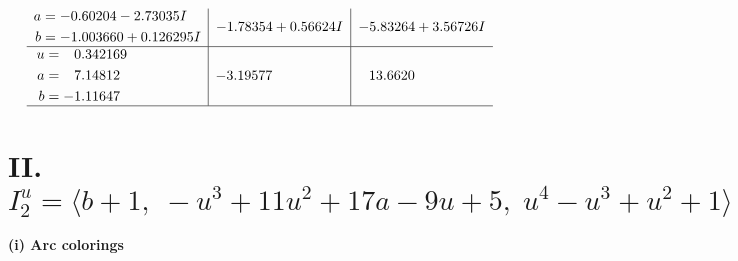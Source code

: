 \documentclass[1p]{elsarticle_modified}
\theoremstyle{definition}
\begin{document}
$$\begin{array}{c|c|c}
\begin{aligned}
a &= -0.60204 - 2.73035 I \\
b &= -1.003660 + 0.126295 I\end{aligned}
 & -1.78354 + 0.56624 I & -5.83264 + 3.56726 I \\ \hline\begin{aligned}
u &= \phantom{-}0.342169\phantom{ +0.000000I} \\
a &= \phantom{-}7.14812\phantom{ +0.000000I} \\
b &= -1.11647\phantom{ +0.000000I}\end{aligned}
 & -3.19577\phantom{ +0.000000I} & \phantom{-}13.6620\phantom{ +0.000000I}\\
 \hline 
 \end{array}$$\newpage\newpage\renewcommand{\arraystretch}{1}
\centering \section*{II. $I^u_{2}= \langle b+1,\;- u^3+11 u^2+17 a-9 u+5,\;u^4- u^3+u^2+1 \rangle$}
\flushleft \textbf{(i) Arc colorings}\\
\end{document}
